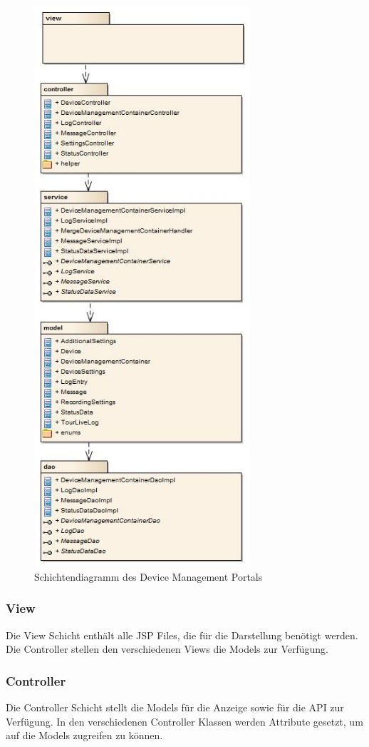 \begin{figure}[H]
	\centering
	\includegraphics[width=80mm]{images/devmgmtsrv/schichten.jpg}
	\caption{Schichtendiagramm des Device Management Portals}
\end{figure}

\subsubsection{View}
Die View Schicht enthält alle JSP Files, die für die Darstellung benötigt werden. Die Controller stellen den verschiedenen Views die Models zur Verfügung.

\subsubsection{Controller}
Die Controller Schicht stellt die Models für die Anzeige sowie für die API zur Verfügung. In den verschiedenen Controller Klassen werden Attribute gesetzt, um auf die Models zugreifen zu können.

